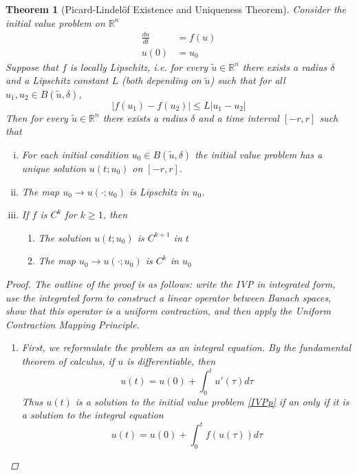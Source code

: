 \documentclass[10pt]{article}         %
\newtheorem{theorem}{Theorem}[section]
\theoremstyle{remark}
\newcommand{\R}{\mathbb{R}}
\begin{document}
\begin{theorem}[Picard-Lindel\"{o}f Existence and Uniqueness Theorem]
Consider the initial value problem on $\R^n$
\begin{align}\label{IVPp}
\frac{du}{dt} &= f(u) \\
u(0) &= u_0 \nonumber
\end{align}
Suppose that $f$ is locally Lipschitz, i.e. for every $\tilde{u} \in \R^n$ there exists a radius $\delta$ and a Lipschitz constant $L$ (both depending on $\tilde{u}$) such that for all $u_1, u_2 \in B(\tilde{u}, \delta)$,
\[
|f(u_1) - f(u_2)| \leq L|u_1 - u_2|
\]
Then for every $\tilde{u} \in \R^n$ there exists a radius $\delta$ and a time interval $[-r, r]$ such that
\begin{enumerate}[(i)]
\item For each initial condition $u_0 \in B(\tilde{u}, \delta)$ the initial value problem has a unique solution $u(t; u_0)$ on $[-r, r]$.
\item The map $u_0 \rightarrow u(\cdot; u_0)$ is Lipschitz in $u_0$.
\item If $f$ is $C^k$ for $k \geq 1$, then
\begin{enumerate}
\item The solution $u(t; u_0)$ is $C^{k+1}$ in $t$
\item The map $u_0 \rightarrow u(\cdot; u_0)$ is $C^k$ in $u_0$
\end{enumerate}
\end{enumerate}
\begin{proof}
The outline of the proof is as follows: write the IVP in integrated form, use the integrated form to construct a linear operator between Banach spaces, show that this operator is a uniform contraction, and then apply the Uniform Contraction Mapping Principle.
\begin{enumerate}

\item First, we reformulate the problem as an integral equation. By the fundamental theorem of calculus, if $u$ is differentiable, then
\begin{equation*}
u(t) = u(0) + \int_0^t u'(\tau) d \tau
\end{equation*}
Thus $u(t)$ is a solution to the initial value problem \eqref{IVPp} if an only if it is a solution to the integral equation
\begin{equation}\label{intform}
u(t) = u(0) + \int_0^t f(u(\tau)) d \tau
\end{equation}


\end{enumerate}
\end{proof}
\end{theorem}
\end{document}

